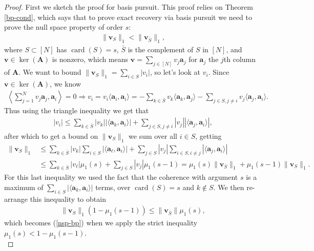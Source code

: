 \documentclass[12pt,a4paper]{amsart}
\numberwithin{equation}{section}
\theoremstyle{plain}
\theoremstyle{definition}
\newcommand{\bdv}{\mathbf{v}}
\newcommand{\bda}{\mathbf{a}}
\newcommand{\bdA}{\mathbf{A}}
\DeclareMathOperator{\card}{card}
\begin{document}
\begin{proof}
    First we sketch the proof for basis pursuit. This proof relies on Theorem \ref{bp-cond}, which says that to prove exact recovery via basis pursuit we need to prove the null space property of order $s$:
    \begin{align}\label{nsp-bp}
        \|\bdv_S\|_1<\|\bdv_{\bar S}\|_1,
    \end{align}
    where $S\subset[N]$ has $\card(S)=s$, $\bar S$ is the complement of $S$ in $[N]$, and $\bdv\in\ker(\bdA)$ is nonzero, which means $\bdv=\sum_{j\in[N]}v_j\bda_j$ for $\bda_j$ the $j$th column of $\bdA$. We want to bound $\|\bdv_S\|_1=\sum_{i\in S}|v_i|$, so let's look at $v_i$. Since $\bdv\in\ker(\bdA)$, we know
    \begin{align*}
        \left\langle\sum_{j=1}^Nv_j\bda_j,\bda_i\right\rangle=0\Rightarrow v_i=v_i\langle\bda_i,\bda_i\rangle=-\sum_{k\in\bar S}v_k\langle\bda_k,\bda_j\rangle-\sum_{j\in S,j\neq i}v_j\langle\bda_j,\bda_i\rangle.
    \end{align*}
    Thus using the triangle inequality we get that
    \begin{align*}
        |v_i|\leq\sum_{k\in\bar S}|v_k||\langle\bda_k,\bda_i\rangle|+\sum_{j\in S,j\neq i}|v_j||\langle\bda_j,\bda_i\rangle|,
    \end{align*}
    after which to get a bound on $\|\bdv_S\|_1$ we sum over all $i\in S$, getting
    \begin{align*}
        \|\bdv_S\|_1&\leq\sum_{k\in\bar S}|v_k|\sum_{i\in S}|\langle\bda_\ell,\bda_i\rangle|+\sum_{j\in S}|v_j|\sum_{i\in S,i\neq j}|\langle\bda_j,\bda_i\rangle|\\&\leq\sum_{k\in\bar S}|v_\ell|\mu_1(s)+\sum_{j\in S}|v_j|\mu_1(s-1)=\mu_1(s)\|\bdv_{\bar S}\|_1+\mu_1(s-1)\|\bdv_S\|_1.
    \end{align*}
    For this last inequality we used the fact that the coherence with argument $s$ is a maximum of $\sum_{i\in S}|\langle\bda_k,\bda_i\rangle|$ terms, over $\card(S)=s$ and $k\notin S$. We then re-arrange this inequality to obtain
    \begin{align*}
        \|\bdv_S\|_1(1-\mu_1(s-1))\leq\|\bdv_{\bar S}\|\mu_1(s),
    \end{align*}
    which becomes (\ref{nsp-bp}) when we apply the strict inequality $\mu_1(s)<1-\mu_1(s-1)$.\\
    
\end{proof}
\end{document}
